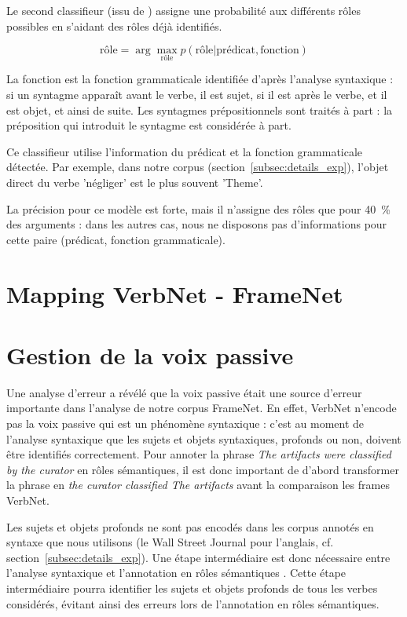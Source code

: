Le second classifieur (issu de \cite{swier2004unsupervised}) assigne une
probabilité aux différents rôles possibles en s'aidant des rôles déjà
identifiés.

$$ \text{rôle} = \arg\max_{\text{rôle}} p(\text{rôle} \vert \text{prédicat}, \text{fonction})$$

La fonction est la fonction grammaticale identifiée d'après l'analyse
syntaxique : si un syntagme apparaît avant le verbe, il est sujet, si il est
après le verbe, et il est objet, et ainsi de suite. Les syntagmes
prépositionnels sont traités à part : la préposition qui introduit le syntagme
est considérée à part.

Ce classifieur utilise l'information du prédicat et la fonction grammaticale
détectée. Par exemple, dans notre corpus (section~\ref{subsec:details_exp}),
l'objet direct du verbe 'négliger' est le plus souvent 'Theme'.

La précision pour ce modèle est forte, mais il n'assigne des rôles que pour
40~\% des arguments : dans les autres cas, nous ne disposons pas d'informations
pour cette paire (prédicat, fonction grammaticale).

\section{Mapping VerbNet - FrameNet}
\label{sec:mapping}


\section{Gestion de la voix passive}
\label{sec:passif}

Une analyse d'erreur a révélé que la voix passive était une source d'erreur
importante dans l'analyse de notre corpus FrameNet. En effet, VerbNet n'encode
pas la voix passive qui est un phénomène syntaxique : c'est au moment de
l'analyse syntaxique que les sujets et objets syntaxiques, profonds ou non,
doivent être identifiés correctement. Pour annoter la phrase \emph{The
artifacts were classified by the curator} en rôles sémantiques, il est donc
important de d'abord transformer la phrase en \emph{the curator classified The
artifacts} avant la comparaison les frames VerbNet.

Les sujets et objets profonds ne sont pas encodés dans les corpus annotés en
syntaxe que nous utilisons (le Wall Street Journal pour l'anglais, cf.
section~\ref{subsec:details_exp}). Une étape intermédiaire est donc nécessaire
entre l'analyse syntaxique et l'annotation en rôles sémantiques
\citep{bonfante2011modular, ribeyre2013systeme}. Cette étape intermédiaire
pourra identifier les sujets et objets profonds de tous les verbes considérés,
évitant ainsi des erreurs lors de l'annotation en rôles sémantiques. 

